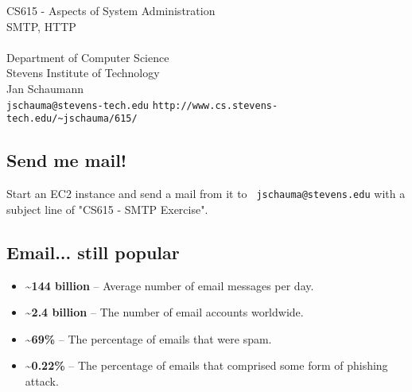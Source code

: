 \documentclass[xga]{xdvislides}
\begin{document}
\setfontphv

\lhead{\slidetitle}                               %
\cfoot{\relax}                               %
\rfoot{\Gray{\today}}

\vspace*{\fill}
\begin{center}
	\Hugesize
		CS615 - Aspects of System Administration\\ [1em]
		SMTP, HTTP \\ [1em]
	\hspace*{5mm}\blueline\\ [1em]
	\Normalsize
		Department of Computer Science\\
		Stevens Institute of Technology\\
		Jan Schaumann\\
		\verb+jschauma@stevens-tech.edu+
		\verb+http://www.cs.stevens-tech.edu/~jschauma/615/+
\end{center}
\vspace*{\fill}

\subsection{Send me mail!}

\vspace*{\fill}
Start an EC2 instance and send a mail from it to {\tt
jschauma@stevens.edu} with a subject line of "CS615 - SMTP Exercise".
\vspace*{\fill}

\subsection{Email... still popular}
\begin{itemize}
	\item {\bf \~{}144 billion} – Average number of email messages per day.
	\item {\bf \~{}2.4 billion} – The number of email accounts worldwide.
	\item {\bf \~{}69\%} – The percentage of emails that were spam.
	\item {\bf \~{}0.22\%} – The percentage of emails that comprised some form of phishing attack.
\end{itemize}
\end{document}
